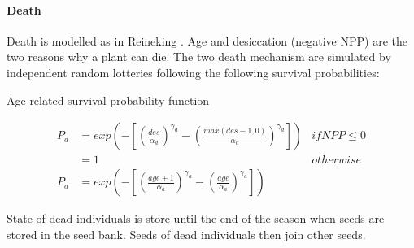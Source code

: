 \paragraph{Death} Death is modelled as in Reineking \parencite{reineking_environmental_2006}. Age and desiccation (negative NPP) are the two reasons why a plant can die. The two death mechanism are simulated by independent random lotteries following the following survival probabilities:

\begin{marginfigure}[-10pt]
\label{fig:derivaives}
\caption{Age related survival probability function}
\end{marginfigure}

\begin{align}
P_{d} &=  exp \left( - \left[\left(\frac{des}{\alpha_{d}}\right)^{\gamma_{d}} - \left(\frac{max(des - 1, 0)}{\alpha_{d}}\right)^{\gamma_{d}}\right]\right) & if NPP \le 0\\
&= 1 & otherwise\\
P_{a} &= exp \left( - \left[\left(\frac{age + 1}{\alpha_{a}}\right)^{\gamma_{a}} - \left(\frac{age}{\alpha_{a}}\right)^{\gamma_{a}}\right]\right)
\end{align}

State of dead individuals is store until the end of the season when seeds are stored in the seed bank. Seeds of dead individuals then join other seeds.

